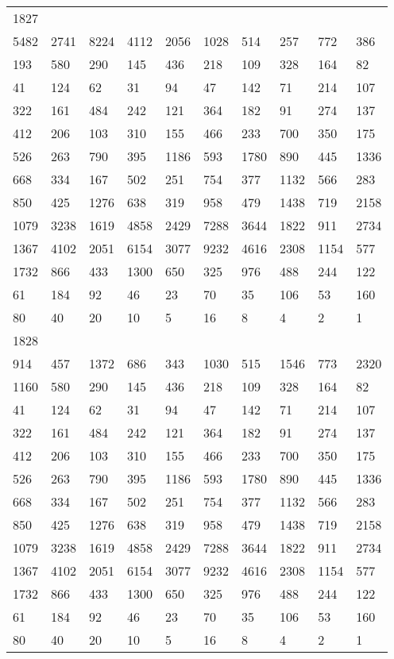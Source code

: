 \begin{longtable}{*{10}{l}}
1827&&&&&&&&&\\
5482& 2741& 8224& 4112& 2056& 1028& 514& 257& 772& 386\\
193& 580& 290& 145& 436& 218& 109& 328& 164& 82\\
41& 124& 62& 31& 94& 47& 142& 71& 214& 107\\
322& 161& 484& 242& 121& 364& 182& 91& 274& 137\\
412& 206& 103& 310& 155& 466& 233& 700& 350& 175\\
526& 263& 790& 395& 1186& 593& 1780& 890& 445& 1336\\
668& 334& 167& 502& 251& 754& 377& 1132& 566& 283\\
850& 425& 1276& 638& 319& 958& 479& 1438& 719& 2158\\
1079& 3238& 1619& 4858& 2429& 7288& 3644& 1822& 911& 2734\\
1367& 4102& 2051& 6154& 3077& 9232& 4616& 2308& 1154& 577\\
1732& 866& 433& 1300& 650& 325& 976& 488& 244& 122\\
61& 184& 92& 46& 23& 70& 35& 106& 53& 160\\
80& 40& 20& 10& 5& 16& 8& 4& 2& 1\\

1828&&&&&&&&&\\
914& 457& 1372& 686& 343& 1030& 515& 1546& 773& 2320\\
1160& 580& 290& 145& 436& 218& 109& 328& 164& 82\\
41& 124& 62& 31& 94& 47& 142& 71& 214& 107\\
322& 161& 484& 242& 121& 364& 182& 91& 274& 137\\
412& 206& 103& 310& 155& 466& 233& 700& 350& 175\\
526& 263& 790& 395& 1186& 593& 1780& 890& 445& 1336\\
668& 334& 167& 502& 251& 754& 377& 1132& 566& 283\\
850& 425& 1276& 638& 319& 958& 479& 1438& 719& 2158\\
1079& 3238& 1619& 4858& 2429& 7288& 3644& 1822& 911& 2734\\
1367& 4102& 2051& 6154& 3077& 9232& 4616& 2308& 1154& 577\\
1732& 866& 433& 1300& 650& 325& 976& 488& 244& 122\\
61& 184& 92& 46& 23& 70& 35& 106& 53& 160\\
80& 40& 20& 10& 5& 16& 8& 4& 2& 1\\


\end{longtable}
